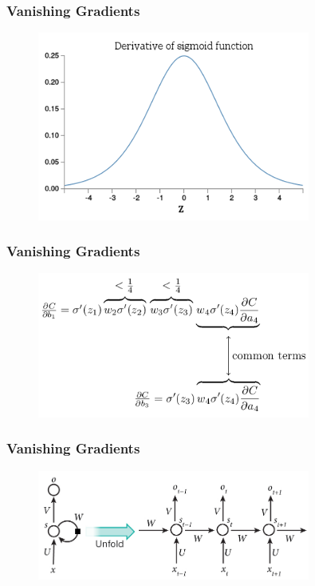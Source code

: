 \documentclass{beamer}
\begin{document}
\begin{frame}
	\frametitle{Vanishing Gradients}
	
	\begin{figure}
		\includegraphics[width=0.8\textwidth]{imgs/sigmoid_derivative}
	\end{figure}
\end{frame}


\begin{frame}
	\frametitle{Vanishing Gradients}
	
	\begin{figure}
		\includegraphics[width=0.8\textwidth]{imgs/chaining_example}
	\end{figure}
\end{frame}


\begin{frame}
	\frametitle{Vanishing Gradients}
	
	\begin{figure}
		\includegraphics[width=0.8\textwidth]{imgs/rnn_unfolded}
	\end{figure}
\end{frame}
\end{document}
